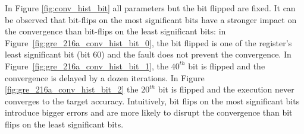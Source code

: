 In Figure \ref{fig:conv_hist_bit} all parameters but the bit flipped are fixed. It can be observed that bit-flips on the most significant bits have a stronger impact on the convergence than bit-flips on the least significant bits: in Figure~\ref{fig:gre_216a_conv_hist_bit_0}, the bit flipped is one of the register's least significant bit (bit 60) and the fault does not prevent the convergence. In Figure~\ref{fig:gre_216a_conv_hist_bit_1}, the $40^{th}$ bit is flipped and the convergence is delayed by a dozen iterations. In Figure \ref{fig:gre_216a_conv_hist_bit_2} the $20^{th}$ bit is flipped and the execution never converges to the target accuracy.
Intuitively, bit flips on the most significant bits introduce bigger errors and are more likely to disrupt the convergence than bit flips on the least significant bits.





